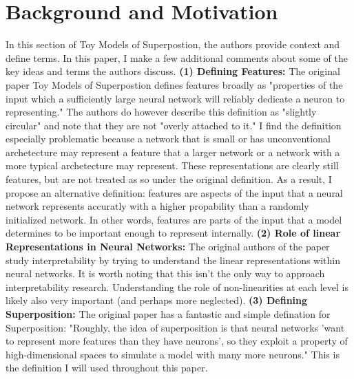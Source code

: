 \documentclass{article} %
\begin{document}
\section{Background and Motivation}
In this section of Toy Models of Superpostion\cite{elhage2022toy}, the authors
provide context and define terms.  In this paper, I make a few additional comments 
about some of the key ideas and terms the authors discuss. \newline \newline
\textbf{(1) Defining Features: }The original paper Toy Models of Superpostion
defines features broadly as "properties of the input which a sufficiently large 
neural network will reliably dedicate a neuron to representing." The authors do
however describe this definition as "slightly circular" and note that they are
not "overly attached to it." I find the definition especially problematic because a network that is small or
has unconventional archetecture may represent a feature that a larger network
or a network with a more typical archetecture may represent. These 
representations are clearly still features, but are not treated as so under the
original definition.\newline\newline
As a result, I propose an alternative definition: features are aspects of the
input that a neural network represents accuratly with a higher propability than 
a randomly initialized network. In other words, features are parts of the input 
that a model determines to be important enough to represent internally.\newline\newline
\textbf{(2) Role of linear Representations in Neural Networks: }The original authors
of the paper study interpretability by trying to understand the linear representations
within neural networks. It is worth noting that this isn't the only way to approach
interpretability research. Understanding the role of non-linearities at each level
is likely also very important (and perhaps more neglected).\newline\newline
\textbf{(3) Defining Superposition: } The original paper has a fantastic and
simple defination for Superposition: "Roughly, the idea of 
superposition is that neural networks 'want to represent more features than they 
have neurons', so they exploit a property of high-dimensional spaces to 
simulate a model with many more neurons." This is the definition I will used
throughout this paper.
\end{document}
